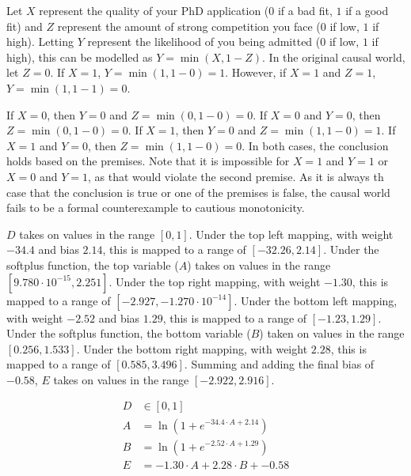 \documentclass{article}
\begin{document}
Let $X$ represent the quality of your PhD application ($0$ if a bad fit, $1$ if a good fit) and $Z$ represent the amount of strong competition you face ($0$ if low, $1$ if high). Letting $Y$ represent the likelihood of you being admitted ($0$ if low, $1$ if high), this can be modelled as $Y = \min(X, 1 - Z)$. In the original causal world, let $Z = 0$. If $X = 1$, $Y = \min(1, 1 - 0) = 1$. However, if $X = 1$ and $Z = 1$, $Y = \min(1, 1 - 1) = 0$.

\clearpage

\problem{}
If $X = 0$, then $Y = 0$ and $Z = \min(0, 1 - 0) = 0$. If $X = 0$ and $Y = 0$, then $Z = \min(0, 1 - 0) = 0$. If $X = 1$, then $Y = 0$ and $Z = \min(1, 1 - 0) = 1$. If $X = 1$ and $Y = 0$, then $Z = \min(1, 1 - 0) = 0$. In both cases, the conclusion holds based on the premises. Note that it is impossible for $X = 1$ and $Y = 1$ or $X = 0$ and $Y = 1$, as that would violate the second premise. As it is always th case that the conclusion is true or one of the premises is false, the causal world fails to be a formal counterexample to cautious monotonicity.

\clearpage

\problem{}
\begin{center}
\end{center}

$D$ takes on values in the range $[0, 1]$. Under the top left mapping, with weight $-34.4$ and bias $2.14$, this is mapped to a range of $[-32.26, 2.14]$. Under the softplus function, the top variable ($A$) takes on values in the range $[9.780 \cdot 10^{-15}, 2.251]$. Under the top right mapping, with weight $-1.30$, this is mapped to a range of $[-2.927, -1.270 \cdot 10^{-14}]$. Under the bottom left mapping, with weight $-2.52$ and bias $1.29$, this is mapped to a range of $[-1.23, 1.29]$. Under the softplus function, the bottom variable ($B$) taken on values in the range $[0.256, 1.533]$. Under the bottom right mapping, with weight $2.28$, this is mapped to a range of $[0.585, 3.496]$. Summing and adding the final bias of $-0.58$, $E$ takes on values in the range $[-2.922, 2.916]$.

\begin{align*}
    D & \in [0, 1] \\
    A & = \ln(1 + e^{-34.4 \cdot A + 2.14}) \\
    B & = \ln(1 + e^{-2.52 \cdot A + 1.29}) \\
    E & = -1.30 \cdot A + 2.28 \cdot B + -0.58 \\
\end{align*}
\end{document}
